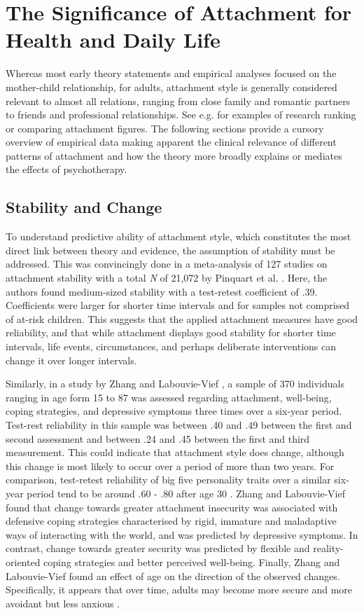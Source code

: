 \documentclass[12pt]{report}
\begin{document}
\chapter{The Significance of Attachment for Health and Daily Life}
\label{sec:theory and review}
Whereas most early theory statements and empirical analyses focused on the mother-child relationship, for adults, attachment style is generally considered relevant to almost all relations, ranging from close family and romantic partners to friends and professional relationships.
See e.g.  for examples of research ranking or comparing attachment figures.
The following sections provide a cursory overview of empirical data making apparent the clinical relevance of different patterns of attachment and how the theory more broadly explains or mediates the effects of psychotherapy.

\section{Stability and Change}
To understand predictive ability of attachment style, which constitutes the most direct link between theory and evidence, the assumption of stability must be addressed.
This was convincingly done in a meta-analysis of 127 studies on attachment stability with a total \textit{N} of 21,072 by Pinquart et al. \citeyear{Pinquart2013}.
Here, the authors found medium-sized stability with a test-retest coefficient of .39.
Coefficients were larger for shorter time intervals and for samples not comprised of at-risk children.
This suggests that the applied attachment measures have good reliability, and that while attachment displays good stability for shorter time intervals, life events, circumstances, and perhaps deliberate interventions can change it over longer intervals.

Similarly, in a study by Zhang and Labouvie-Vief \citeyear{Zhang2004}, a sample of 370 individuals ranging in age form 15 to 87 was assessed regarding attachment, well-being, coping strategies, and depressive symptoms three times over a six-year period.
Test-rest reliability in this sample was between .40 and .49 between the first and second assessment and between .24 and .45 between the first and third measurement. This could indicate that attachment style does change, although this change is most likely to occur over a period of more than two years.
For comparison, test-retest reliability of big five personality traits over a similar six-year period tend to be around .60 - .80 after age 30 \cite{Costa1988,Roberts2000}.
Zhang and Labouvie-Vief \citeyear{Zhang2004} found that change towards greater attachment insecurity was associated with defensive coping strategies characterised by rigid, immature and maladaptive ways of interacting with the world, and was predicted by depressive symptoms.
In contrast, change towards greater security was predicted by flexible and reality-oriented coping strategies and better perceived well-being.
Finally, Zhang and Labouvie-Vief found an effect of age on the direction of the observed changes.
Specifically, it appears that over time, adults may become more secure and more avoidant but less anxious  \cite{Zhang2004}.
\end{document}
